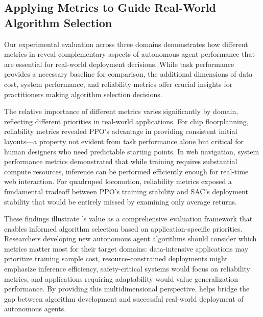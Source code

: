 \subsection{ Applying Metrics to Guide Real-World Algorithm Selection}\vspace{-0.2cm}


Our experimental evaluation across three domains demonstrates how different metrics in \method reveal complementary aspects of autonomous agent performance that are essential for real-world deployment decisions. While task performance provides a necessary baseline for comparison, the additional dimensions of data cost, system performance, and reliability metrics offer crucial insights for practitioners making algorithm selection decisions.

The relative importance of different metrics varies significantly by domain, reflecting different priorities in real-world applications.
For chip floorplanning, reliability metrics revealed PPO's advantage in providing consistent initial layouts—a property not evident from task performance alone but critical for human designers who need predictable starting points.
In web navigation, system performance metrics demonstrated that while training requires substantial compute resources, inference can be performed efficiently enough for real-time web interaction.
For quadruped locomotion, reliability metrics exposed a fundamental tradeoff between PPO's training stability and SAC's deployment stability that would be entirely missed by examining only average returns.

These findings illustrate \method's value as a comprehensive evaluation framework that enables informed algorithm selection based on application-specific priorities. Researchers developing new autonomous agent algorithms should consider which metrics matter most for their target domains: data-intensive applications may prioritize training sample cost, resource-constrained deployments might emphasize inference efficiency, safety-critical systems would focus on reliability metrics, and applications requiring adaptability would value generalization performance. By providing this multidimensional perspective, \method helps bridge the gap between algorithm development and successful real-world deployment of autonomous agents.